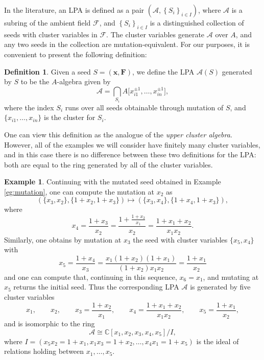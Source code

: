 \documentclass[10pt,a4paper]{amsart}
\numberwithin{equation}{section}
\theoremstyle{definition}
\newtheorem{defn}[thm]{Definition}
\newtheorem{eg}[thm]{Example}
\begin{document}
In the literature, an LPA is defined as a pair $\left(\mathcal{A}, \left\{S_i\right\}_{i\in I}\right)$, where $\mathcal A$ is a subring of the ambient field $\mathcal F$, and $\left\{ S_i \right\}_{i\in I}$ is a distinguished collection of seeds with cluster variables in $\mathcal F$. The cluster variables generate $\mathcal A$ over $A$, and any two seeds in the collection are mutation-equivalent. For our purposes, it is convenient to present the following definition:
\begin{defn}
	Given a seed $S = (\bm{x}, \bm{F})$, we define the LPA $\mathcal{A}(S)$ generated by $S$ to be the $A$-algebra given by
	\begin{equation*}
		\mathcal{A} = \bigcap_{S_i} A\big[x_{i1}^{\pm1}, \ldots, x_{in}^{\pm1}\big],
	\end{equation*}
	where the index $S_i$ runs over all seeds obtainable through mutation of $S$, and $\{x_{i1}, \dots , x_{in}\}$ is the cluster for $S_i$.
\end{defn}

One can view this definition as the analogue of the \emph{upper cluster algebra}. However, all of the examples we will consider have finitely many cluster variables, and in this case there is no difference between these two definitions for the LPA: both are equal to the ring generated by all of the cluster variables.

\begin{eg}
Continuing with the mutated seed obtained in Example \ref{eg:mutation}, one can compute the mutation at $x_2$ as
\[
 ( \{x_3, x_2\}, \{1 + x_2, 1 + x_3\} ) \mapsto ( \{x_3, x_4\}, \{1 + x_4, 1 + x_3\} ),
\]
where
\[
 x_4 = \frac{1 + x_3}{x_2} = \frac{1 + \frac{1 + x_2}{x_1}}{x_2} = \frac{1 + x_1 + x_2}{x_1x_2}.
\]
Similarly, one obtains by mutation at $x_3$ the seed with cluster variables $\{x_5, x_4\}$ with
\[
 x_5 = \frac{1 + x_4}{x_3} = \frac{x_1(1 + x_2)(1+x_1)}{(1+x_2)x_1x_2} = \frac{1 + x_1}{x_2}
\]
and one can compute that, continuing in this sequence, $x_6 = x_1$, and mutating at $x_5$ returns the initial seed. Thus the corresponding LPA $\mathcal A$ is generated by five cluster variables
\[
 x_1, \qquad x_2, \qquad x_3=\frac{1 + x_2}{x_1}, \qquad x_4=\frac{1 + x_1 + x_2}{x_1x_2}, \qquad x_5=\frac{1 + x_1}{x_2},
\]
and is isomorphic to the ring
\[ \mathcal A \cong \mathbb{C}[x_1,x_2,x_3,x_4,x_5]/I, \]
where $I=(x_5x_2=1+x_1, x_1x_3=1+x_2, \ldots, x_4x_1=1+x_5)$ is the ideal of relations holding between $x_1,\ldots,x_5$.
\end{eg}
\end{document}
